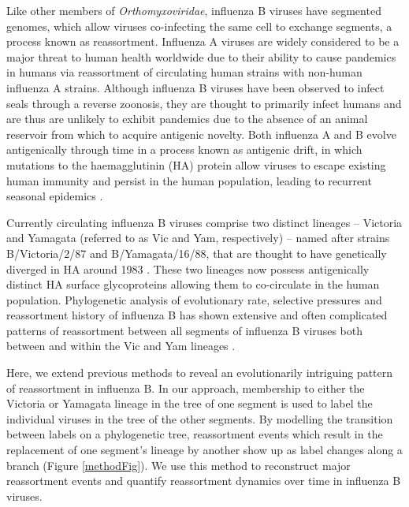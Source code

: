 \documentclass[11pt,oneside,letterpaper]{article}
\begin{document}
Like other members of \textit{Orthomyxoviridae}, influenza B viruses have segmented genomes, which allow viruses co-infecting the same cell to exchange segments, a process known as reassortment. 
Influenza A viruses are widely considered to be a major threat to human health worldwide due to their ability to cause pandemics in humans via reassortment of circulating human strains with non-human influenza A strains. 
Although influenza B viruses have been observed to infect seals \cite{osterhaus2000,bodewes2013} through a reverse zoonosis, they are thought to primarily infect humans and are thus are unlikely to exhibit pandemics due to the absence of an animal reservoir from which to acquire antigenic novelty. 
Both influenza A and B evolve antigenically through time in a process known as antigenic drift, in which mutations to the haemagglutinin (HA) protein allow viruses to escape existing human immunity and persist in the human population, leading to recurrent seasonal epidemics \cite{burnet1955,hay2001,bedford2014}.

Currently circulating influenza B viruses comprise two distinct lineages -- Victoria and Yamagata (referred to as Vic and Yam, respectively) -- named after strains B/Victoria/2/87 and B/Yamagata/16/88, that are thought to have genetically diverged in HA around 1983 \cite{rota1990}. 
These two lineages now possess antigenically distinct HA surface glycoproteins \cite{kanegae1990,rota1990,nerome1998,nakagawa2002,ansaldi2003} allowing them to co-circulate in the human population.
Phylogenetic analysis of evolutionary rate, selective pressures and reassortment history of influenza B has shown extensive and often complicated patterns of reassortment between all segments of influenza B viruses both between and within the Vic and Yam lineages \cite{chen2008}.

Here, we extend previous methods to reveal an evolutionarily intriguing pattern of reassortment in influenza B.
In our approach, membership to either the Victoria or Yamagata lineage in the tree of one segment is used to label the individual viruses in the tree of the other segments.
By modelling the transition between labels on a phylogenetic tree, reassortment events which result in the replacement of one segment's lineage by another show up as label changes along a branch (Figure \ref{methodFig}).
We use this method to reconstruct major reassortment events and quantify reassortment dynamics over time in influenza B viruses.
\end{document}

